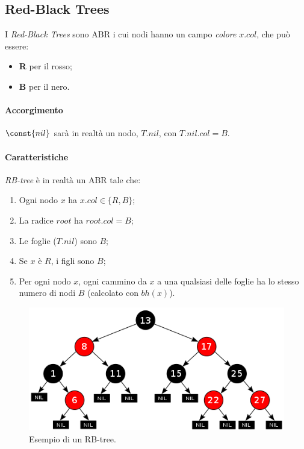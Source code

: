 \subsection{Red-Black Trees}

I \emph{Red-Black Trees} sono ABR i cui nodi hanno un campo \emph{colore} $x.col$, che può essere:
\begin{itemize}[noitemsep]
    \item \textbf{R} per il rosso;
    \item \textbf{B} per il nero.
\end{itemize}

\paragraph{Accorgimento} $\const{nil}$ sarà in realtà un nodo,
$T.nil$, con $T.nil.col = B$.

\paragraph{Caratteristiche} \emph{RB-tree} è in realtà un ABR tale che:
\begin{enumerate}[label=($\arabic*$)]
    \item Ogni nodo $x$ ha $x.col \in \{R,B\}$; \label{rbtree:1}
    \item La radice $root$ ha $root.col = B$; \label{rbtree:2}
    \item Le foglie ($T.nil$) sono $B$; \label{rbtree:3}
    \item Se $x$ è $R$, i figli sono $B$; \label{rbtree:4}
    \item Per ogni nodo $x$, ogni cammino da $x$ a una qualsiasi delle foglie
    ha lo stesso numero di nodi $B$ (calcolato con $bh(x)$). \label{rbtree:5}
\end{enumerate} 

\begin{figure}[hbt]
    \centering
    \includegraphics[width=\textwidth]{img/rb-tree-ex.png}
    \caption{Esempio di un RB-tree.}
\end{figure}
\pagebreak

